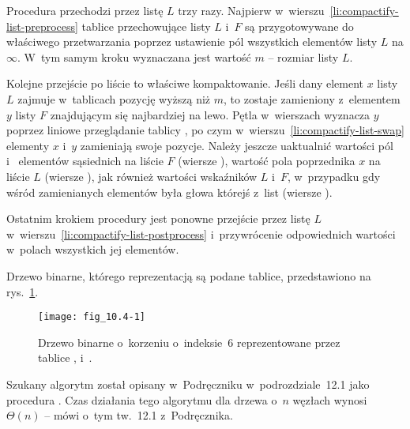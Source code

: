Procedura przechodzi przez listę $L$ trzy razy. Najpierw w~wierszu~\ref{li:compactify-list-preprocess} tablice przechowujące listy $L$ i~$F$ są przygotowywane do właściwego przetwarzania poprzez ustawienie pól  wszystkich elementów listy $L$ na $\infty$. W~tym samym kroku wyznaczana jest wartość $m$ -- rozmiar listy $L$.

Kolejne przejście po liście to właściwe kompaktowanie. Jeśli dany element $x$ listy $L$ zajmuje w~tablicach pozycję wyższą niż $m$, to zostaje zamieniony z~elementem $y$ listy $F$ znajdującym się najbardziej na lewo. Pętla  w~wierszach \doubledash{\ref{li:compactify-list-while2-begin}}{\ref{li:compactify-list-while2-end}} wyznacza $y$ poprzez liniowe przeglądanie tablicy , po czym w~wierszu~\ref{li:compactify-list-swap} elementy $x$ i~$y$ zamieniają swoje pozycje. Należy jeszcze uaktualnić wartości pól  i~ elementów sąsiednich na liście $F$ (wiersze \doubledash{\ref{li:compactify-list-fix-neighbors-begin}}{\ref{li:compactify-list-fix-neighbors-end}}), wartość pola  poprzednika $x$ na liście $L$ (wiersze \doubledash{\ref{li:compactify-list-fix-predecessor-begin}}{\ref{li:compactify-list-fix-predecessor-end}}), jak również wartości wskaźników $L$ i~$F$, w~przypadku gdy wśród zamienianych elementów była głowa którejś z~list (wiersze \doubledash{\ref{li:compactify-list-fix-heads-begin}}{\ref{li:compactify-list-fix-heads-end}}).

Ostatnim krokiem procedury jest ponowne przejście przez listę $L$ w~wierszu~\ref{li:compactify-list-postprocess} i~przywrócenie odpowiednich wartości w~polach  wszystkich jej elementów.


\exercise %
Drzewo binarne, którego reprezentacją są podane tablice, przedstawiono na rys.~\ref{fig:10.4-1}.
\begin{figure}[ht]
	\begin{center}
		\texttt{[image: fig\_10.4-1]}
	\end{center}
	\caption{Drzewo binarne o~korzeniu o~indeksie~6 reprezentowane przez tablice ,  i~.} \label{fig:10.4-1}
\end{figure}

\exercise %
Szukany algorytm został opisany w~Podręczniku w~podrozdziale~12.1 jako procedura . Czas działania tego algorytmu dla drzewa o~$n$ węzłach wynosi $\Theta(n)$ -- mówi o~tym tw.~12.1 z~Podręcznika.

